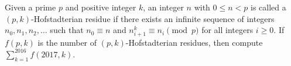 Given a prime $p$ and positive integer $k$, an integer $n$ with $0 \le n < p$ is called a $(p, k)$-Hofstadterian residue if there exists an infinite sequence of integers $n_0, n_1, n_2, \ldots$ such that $n_0 \equiv n$ and $n_{i + 1}^k \equiv n_i \pmod{p}$ for all integers $i \ge 0$. If $f(p, k)$ is the number of $(p, k)$-Hofstadterian residues, then compute $\displaystyle \sum_{k = 1}^{2016} f(2017, k)$.
